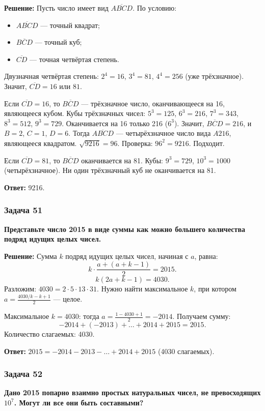 \documentclass[12pt, a4paper]{article}
\begin{document}
\textbf{Решение:}
Пусть число имеет вид $\overline{ABCD}$. По условию:
\begin{itemize}
    \item $\overline{ABCD}$ — точный квадрат;
    \item $\overline{BCD}$ — точный куб;
    \item $\overline{CD}$ — точная четвёртая степень.
\end{itemize}
Двузначная четвёртая степень: $2^4 = 16$, $3^4 = 81$, $4^4 = 256$ (уже трёхзначное). Значит, $\overline{CD} = 16$ или $81$.

Если $\overline{CD} = 16$, то $\overline{BCD}$ — трёхзначное число, оканчивающееся на 16, являющееся кубом. Кубы трёхзначных чисел: $5^3=125$, $6^3=216$, $7^3=343$, $8^3=512$, $9^3=729$. Оканчивается на 16 только 216 ($6^3$). Значит, $\overline{BCD} = 216$, и $B=2$, $C=1$, $D=6$. Тогда $\overline{ABCD}$ — четырёхзначное число вида $A216$, являющееся квадратом. $\sqrt{9216} = 96$. Проверка: $96^2 = 9216$. Подходит.

Если $\overline{CD} = 81$, то $\overline{BCD}$ оканчивается на 81. Кубы: $9^3 = 729$, $10^3 = 1000$ (четырёхзначное). Ни один трёхзначный куб не оканчивается на 81.

\textbf{Ответ:} 9216.

\subsubsection*{Задача 51}
\textbf{Представьте число 2015 в виде суммы как можно большего количества подряд идущих целых чисел.}

\textbf{Решение:}
Сумма $k$ подряд идущих целых чисел, начиная с $a$, равна:
\[
k \cdot \frac{a + (a+k-1)}{2} = 2015.
\]
\[
k(2a + k - 1) = 4030.
\]
Разложим: $4030 = 2 \cdot 5 \cdot 13 \cdot 31$. Нужно найти максимальное $k$, при котором $a = \frac{4030/k - k + 1}{2}$ — целое.

Максимальное $k = 4030$: тогда $a = \frac{1 - 4030 + 1}{2} = -2014$. Получаем сумму:
\[
-2014 + (-2013) + \ldots + 2014 + 2015 = 2015.
\]
Количество слагаемых: 4030.

\textbf{Ответ:} $2015 = -2014 - 2013 - \ldots + 2014 + 2015$ (4030 слагаемых).

\subsubsection*{Задача 52}
\textbf{Дано 2015 попарно взаимно простых натуральных чисел, не превосходящих \(10^7\). Могут ли все они быть составными?}
\end{document}
